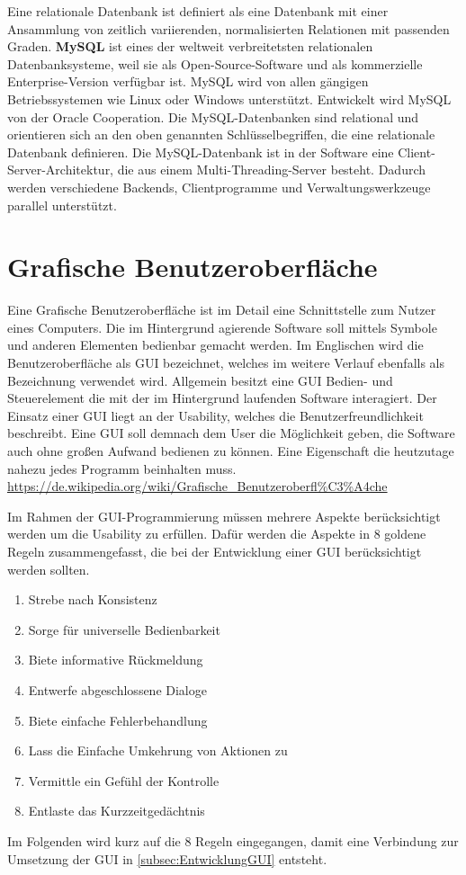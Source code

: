 \documentclass[a4paper,titlepage,halfparskip,12pt]{scrreprt}
\begin{document}
\begin{onehalfspacing}
Eine relationale Datenbank ist definiert als eine Datenbank mit einer Ansammlung von zeitlich variierenden, normalisierten Relationen mit passenden Graden.
\textbf{MySQL} ist eines der weltweit verbreitetsten relationalen Datenbanksysteme, weil sie als Open-Source-Software und als kommerzielle Enterprise-Version verfügbar ist. MySQL wird von allen gängigen Betriebssystemen wie Linux oder Windows unterstützt. Entwickelt wird MySQL von der Oracle Cooperation. Die MySQL-Datenbanken sind relational und orientieren sich an den oben genannten Schlüsselbegriffen, die eine relationale Datenbank definieren. Die MySQL-Datenbank ist in der Software eine Client-Server-Architektur, die aus einem Multi-Threading-Server besteht. Dadurch werden verschiedene Backends, Clientprogramme und Verwaltungswerkzeuge parallel unterstützt.\cite{MysqlDoc}
\newpage

\section{Grafische Benutzeroberfläche}
\label{sec:Benutzeroberfläche}
Eine Grafische Benutzeroberfläche ist im Detail eine Schnittstelle zum Nutzer eines Computers. Die im Hintergrund agierende Software soll mittels Symbole und anderen Elementen bedienbar gemacht werden. Im Englischen wird die Benutzeroberfläche als \ac{GUI} bezeichnet, welches im weitere Verlauf ebenfalls als Bezeichnung verwendet wird. Allgemein besitzt eine \ac{GUI} Bedien- und Steuerelement die mit der im Hintergrund laufenden Software interagiert. Der Einsatz einer \ac{GUI} liegt an der Usability, welches die Benutzerfreundlichkeit beschreibt. Eine \ac{GUI} soll demnach dem User die Möglichkeit geben, die Software auch ohne großen Aufwand bedienen zu können. Eine Eigenschaft die heutzutage nahezu jedes Programm beinhalten muss. %
\url{https://de.wikipedia.org/wiki/Grafische_Benutzeroberfl%C3%A4che}
	
Im Rahmen der GUI-Programmierung müssen mehrere Aspekte berücksichtigt werden um die Usability zu erfüllen. Dafür werden die Aspekte in 8 goldene Regeln zusammengefasst, die bei der Entwicklung einer GUI berücksichtigt werden sollten.
\begin{enumerate}
	\item Strebe nach Konsistenz
	\item Sorge für universelle Bedienbarkeit
	\item Biete informative Rückmeldung
	\item Entwerfe abgeschlossene Dialoge
	\item Biete einfache Fehlerbehandlung
	\item Lass die Einfache Umkehrung von Aktionen zu
	\item Vermittle ein Gefühl der Kontrolle
	\item Entlaste das Kurzzeitgedächtnis
\end{enumerate}
Im Folgenden wird kurz auf die 8 Regeln eingegangen, damit eine Verbindung zur Umsetzung der \ac{GUI} in \autoref{subsec:EntwicklungGUI} entsteht.


\end{onehalfspacing}
\end{document}
